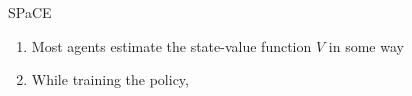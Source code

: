 
\begin{frame}[c]{SPaCE~}
	
	\begin{enumerate}
		\item Most agents estimate the state-value function $V$ in some way
		\item While training the policy, 
	\end{enumerate}
	
\end{frame}

